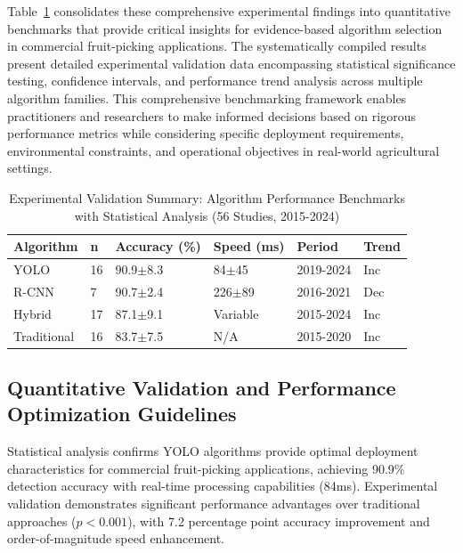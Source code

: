 \documentclass{ieeeaccess}
\begin{document}
Table~\ref{tab:ieee_meta_summary} consolidates these comprehensive experimental findings into quantitative benchmarks that provide critical insights for evidence-based algorithm selection in commercial fruit-picking applications. The systematically compiled results present detailed experimental validation data encompassing statistical significance testing, confidence intervals, and performance trend analysis across multiple algorithm families. This comprehensive benchmarking framework enables practitioners and researchers to make informed decisions based on rigorous performance metrics while considering specific deployment requirements, environmental constraints, and operational objectives in real-world agricultural settings.


\begin{table}[htbp]
\centering
\small
\caption{Experimental Validation Summary: Algorithm Performance Benchmarks with Statistical Analysis (56 Studies, 2015-2024)}
\label{tab:ieee_meta_summary}
\renewcommand{\arraystretch}{1.2}
\begin{tabular}{p{}p{}p{}p{}p{}p{}}
\toprule
\textbf{Algorithm} & \textbf{n} & \textbf{Accuracy (\%)} & \textbf{Speed (ms)} & \textbf{Period} & \textbf{Trend} \\
\midrule
YOLO & 16 & 90.9$\pm$8.3 & 84$\pm$45 & 2019-2024 & Inc \\
R-CNN & 7 & 90.7$\pm$2.4 & 226$\pm$89 & 2016-2021 & Dec \\
Hybrid & 17 & 87.1$\pm$9.1 & Variable & 2015-2024 & Inc \\
Traditional & 16 & 83.7$\pm$7.5 & N/A & 2015-2020 & Inc \\
\bottomrule
\end{tabular}
\end{table}


\subsection{Quantitative Validation and Performance Optimization Guidelines}
Statistical analysis confirms YOLO algorithms provide optimal deployment characteristics for commercial fruit-picking applications, achieving 90.9\% detection accuracy with real-time processing capabilities (84ms). Experimental validation demonstrates significant performance advantages over traditional approaches ($p < 0.001$), with 7.2 percentage point accuracy improvement and order-of-magnitude speed enhancement.
\end{document}
